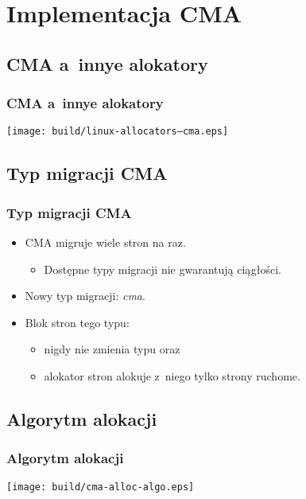 \section[CMA]{Implementacja CMA}

\subsection{CMA a~innye alokatory}

\begin{frame}[fragile]
  \frametitle{CMA a~innye alokatory}

  \begin{center}
    \texttt{[image: build/linux-allocators--cma.eps]}
  \end{center}
\end{frame}

\subsection{Typ migracji CMA}

\begin{frame}
  \frametitle{Typ migracji CMA}

  \begin{itemize}
  \item CMA migruje wiele stron na raz.
    \begin{itemize}
    \item Dostępne typy migracji nie gwarantują ciągłości.
    \end{itemize}
  \item Nowy typ migracji: \textit{cma}.
  \item Blok stron tego typu:
    \begin{itemize}
    \item nigdy nie zmienia typu oraz
    \item alokator stron alokuje z~niego tylko strony ruchome.
    \end{itemize}
  \end{itemize}
\end{frame}

\subsection{Algorytm alokacji}

\begin{frame}
  \frametitle{Algorytm alokacji}

  \begin{center}
    \texttt{[image: build/cma-alloc-algo.eps]}
  \end{center}

\end{frame}

